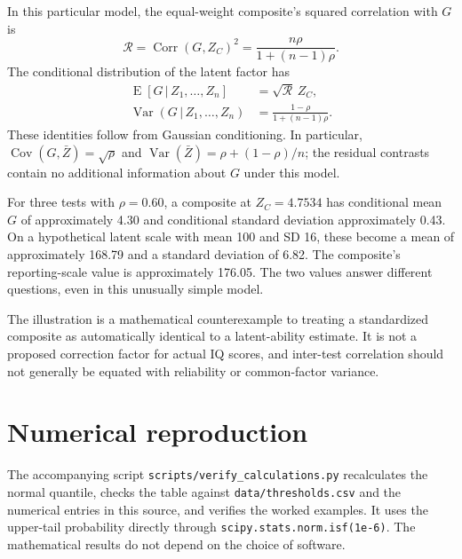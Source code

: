 \documentclass[
  a4paper,fontsize=11pt,parskip=half,headings=small,
  numbers=noenddot,bibliography=totoc
]{scrartcl}
\DeclareMathOperator{\Var}{Var}
\DeclareMathOperator{\Corr}{Corr}
\newcommand{\E}{\operatorname{E}}
\newcommand{\given}{\,\vert\,}
\begin{document}
In this particular model, the equal-weight composite's squared correlation
with \(G\) is
\begin{equation}
  \mathcal R=\Corr(G,Z_C)^2=\frac{n\rho}{1+(n-1)\rho}.
  \label{eq:factor-reliability}
\end{equation}
The conditional distribution of the latent factor has
\begin{align}
  \E[G\given Z_1,\ldots,Z_n]&=\sqrt{\mathcal R}\,Z_C,
  \label{eq:latent-mean}\\
  \Var(G\given Z_1,\ldots,Z_n)&=\frac{1-\rho}{1+(n-1)\rho}.
  \label{eq:latent-variance}
\end{align}
These identities follow from Gaussian conditioning. In particular,
\(\operatorname{Cov}(G,\bar Z)=\sqrt{\rho}\) and
\(\Var(\bar Z)=\rho+(1-\rho)/n\); the residual contrasts contain no
additional information about \(G\) under this model.

For three tests with \(\rho=0.60\), a composite at \(Z_C=4.7534\) has
conditional mean \(G\) of approximately 4.30 and conditional standard
deviation approximately 0.43. On a hypothetical latent scale with mean 100
and SD 16, these become a mean of approximately 168.79 and a standard
deviation of 6.82. The composite's reporting-scale value is approximately
176.05. The two values answer different questions, even in this unusually
simple model.

The illustration is a mathematical counterexample to treating a
standardized composite as automatically identical to a latent-ability
estimate. It is not a proposed correction factor for actual IQ scores,
and inter-test correlation should not generally be equated with reliability
or common-factor variance.

\section{Numerical reproduction}

The accompanying script \texttt{scripts/verify\_calculations.py} recalculates
the normal quantile, checks the table against \texttt{data/thresholds.csv}
and the numerical entries in this source, and verifies the worked examples.
It uses the upper-tail probability directly through
\texttt{scipy.stats.norm.isf(1e-6)}. The mathematical results do not depend
on the choice of software.



\end{document}
